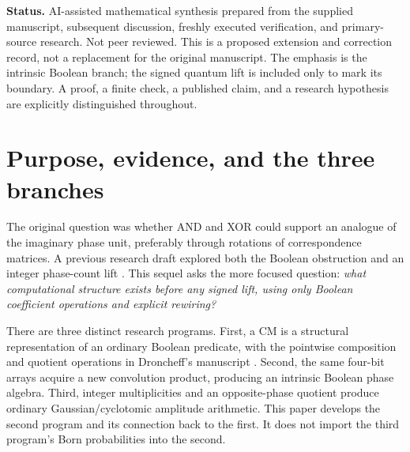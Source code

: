\begin{titlepage}
\begin{minipage}{0.94\textwidth}
\begin{abstract}
Additional results identify a nilpotent bound on phase-oracle interactions, distinguish independent phase registers from shared coefficients, and connect CM parity to local Boolean nonlinearity. A typed CM-to-ANF compiler is derived and tested without truth-table materialization. Prior work on vector logic, modal models, M\"obius/Reed--Muller methods, polar transforms, decision diagrams, and XOR--AND compilation establishes the surrounding landscape. Potential value lies in certified rewrites, structured Boolean analysis, and auditable compilation; practical superiority and physical quantum equivalence are not established.
\end{abstract}
\end{minipage}
\vfill
\begin{minipage}{0.94\textwidth}\small
\textbf{Status.} AI-assisted mathematical synthesis prepared from the supplied manuscript, subsequent discussion, freshly executed verification, and primary-source research. Not peer reviewed. This is a proposed extension and correction record, not a replacement for the original manuscript. The emphasis is the intrinsic Boolean branch; the signed quantum lift is included only to mark its boundary. A proof, a finite check, a published claim, and a research hypothesis are explicitly distinguished throughout.
\end{minipage}
\end{titlepage}
\hypersetup{pageanchor=true}
\tableofcontents
\clearpage
{}

\section{Purpose, evidence, and the three branches}\label{sec:scope}
The original question was whether AND and XOR could support an analogue of the imaginary phase unit, preferably through rotations of correspondence matrices. A previous research draft explored both the Boolean obstruction and an integer phase-count lift \cite{previous}. This sequel asks the more focused question: \emph{what computational structure exists before any signed lift, using only Boolean coefficient operations and explicit rewiring?}

There are three distinct research programs. First, a CM is a structural representation of an ordinary Boolean predicate, with the pointwise composition and quotient operations in Droncheff's manuscript \cite{droncheff}. Second, the same four-bit arrays acquire a new convolution product, producing an intrinsic Boolean phase algebra. Third, integer multiplicities and an opposite-phase quotient produce ordinary Gaussian/cyclotomic amplitude arithmetic. This paper develops the second program and its connection back to the first. It does not import the third program's Born probabilities into the second.

